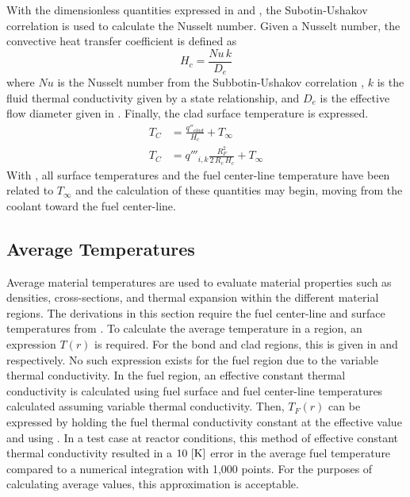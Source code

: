       With the dimensionless quantities expressed in  and
      , the Subotin-Ushakov correlation is used to calculate the 
      Nusselt number. Given a Nusselt number, the convective heat transfer 
      coefficient is defined as
      \begin{equation}
        \label{eq:hc}
        H_c = \frac{N\!u \, k}{D_e}
      \end{equation}
      where $Nu$ is the Nusselt number from the Subbotin-Ushakov correlation
      , $k$ is the fluid thermal conductivity given by 
      a state relationship, and $D_e$ is the effective flow diameter given in
      . Finally, the clad surface temperature is 
      expressed.
      \begin{align}
        T_C &= \frac{q''_{clad}}{H_c} + T_{\infty} \\
        \label{eq:tc}
        T_C &= q'''_{i,k} \frac{R_F^2}{2\,R_c\,H_c} + T_{\infty}
      \end{align}
      With , all surface temperatures and the fuel center-line
      temperature have been related to $T_{\infty}$ and the calculation of these
      quantities may begin, moving from the coolant toward the fuel center-line.

  \subsection{Average Temperatures}
    \label{sec:average_temps}
    Average material temperatures are used to evaluate material properties such
    as densities, cross-sections, and thermal expansion within the different 
    material regions. The
    derivations in this section require the fuel center-line and surface
    temperatures from . To calculate the average
    temperature in a region, an expression $T(r)$ is required. For the bond and
    clad regions, this is given in  and  respectively.
    No such expression exists for the fuel region due to the variable thermal
    conductivity. In the fuel region, an effective constant thermal conductivity
    is calculated using fuel surface and fuel center-line temperatures
    calculated assuming variable thermal conductivity. Then, $T_F(r)$ can be 
    expressed by holding the fuel thermal conductivity constant at the effective
    value and using . In a test case at reactor 
    conditions, this method of effective 
    constant thermal conductivity resulted in a $10 \,\left[\text{{K}}\right]$ error in the 
    average fuel temperature compared to a numerical integration with 1,000
    points. For the purposes of calculating average values, this approximation
    is acceptable.

